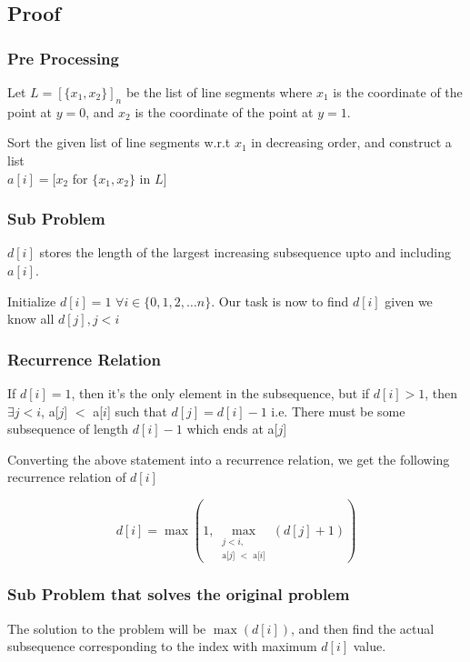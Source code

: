 \documentclass[12pt]{article}
\begin{document}
\subsection{Proof}

\subsubsection{Pre Processing}

Let $L = [\{x_1, x_2\}]_n$ be the list of line segments where $x_1$ is the coordinate of the point at $y = 0$, and $x_2$ is the coordinate of the point at $y = 1$.

Sort the given list of line segments w.r.t $x_1$ in decreasing order, and construct a list \\ $a[i] = [x_2$ for $\{x_1, x_2\}$ in $L]$


\subsubsection{Sub Problem}

$d[i]$ stores the length of the largest increasing subsequence upto and including $a[i]$.

Initialize $d[i] = 1$ $\forall i \in \{0, 1, 2, \dots n\}$.
Our task is now to find $d[i]$ given we know all $d[j], j < i$


\subsubsection{Recurrence Relation}


If $d[i] = 1$, then it's the only element in the subsequence, but if $d[i] > 1$, then $\exists j < i$, a[$j$] $<$ a[$i$] such that $d[j] = d[i] - 1$ i.e. There must be some subsequence of length $d[i] - 1$ which ends at a[$j$]


Converting the above statement into a recurrence relation, we get the following recurrence relation of $d[i]$

\[
    d[i] =  \max \left(
    1,
    \max_{\substack{j < i, \\
        \text{a[$j$] $<$ a[$i$]}}}
    (d[j] + 1)
    \right)
\]

\subsubsection{Sub Problem that solves the original problem}
The solution to the problem will be $\max(d[i])$, and then find the actual subsequence corresponding to the index with maximum $d[i]$ value.
\end{document}

